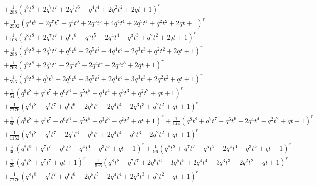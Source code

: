 \documentclass[11pt,english]{amsart}
\numberwithin{equation}{section}
\numberwithin{figure}{section}
\theoremstyle{plain}
\theoremstyle{plain}
\theoremstyle{definition}
\theoremstyle{remark}
\begin{document}
{\begin{align*}
& + \frac{1}{288}  {\left(q^{8} t^{8} + 2  q^{7} t^{7} + 2  q^{6} t^{6} - q^{4} t^{4} + 2  q^{2} t^{2} + 2  q t + 1\right)}^{r} \\
& + \frac{1}{2592}  {\left(q^{8} t^{8} + 2  q^{7} t^{7} + q^{6} t^{6} + 2  q^{5} t^{5} + 4  q^{4} t^{4} + 2  q^{3} t^{3} + q^{2} t^{2} + 2  q t + 1\right)}^{r} \\
& + \frac{1}{108}  {\left(q^{8} t^{8} + 2  q^{7} t^{7} + q^{6} t^{6} - q^{5} t^{5} - 2  q^{4} t^{4} - q^{3} t^{3} + q^{2} t^{2} + 2  q t + 1\right)}^{r} \\
& + \frac{1}{288}  {\left(q^{8} t^{8} + 2  q^{7} t^{7} + q^{6} t^{6} - 2  q^{5} t^{5} - 4  q^{4} t^{4} - 2  q^{3} t^{3} + q^{2} t^{2} + 2  q t + 1\right)}^{r} \\
& + \frac{1}{768}  {\left(q^{8} t^{8} + 2  q^{7} t^{7} - 2  q^{5} t^{5} - 2  q^{4} t^{4} - 2  q^{3} t^{3} + 2  q t + 1\right)}^{r} \\
& + \frac{1}{576}  {\left(q^{8} t^{8} + q^{7} t^{7} + 2  q^{6} t^{6} + 3  q^{5} t^{5} + 2  q^{4} t^{4} + 3  q^{3} t^{3} + 2  q^{2} t^{2} + q t + 1\right)}^{r} \\
& + \frac{1}{54}  {\left(q^{8} t^{8} + q^{7} t^{7} + q^{6} t^{6} + q^{5} t^{5} + q^{4} t^{4} + q^{3} t^{3} + q^{2} t^{2} + q t + 1\right)}^{r} \\
& + \frac{1}{7776}  {\left(q^{8} t^{8} + q^{7} t^{7} + q^{6} t^{6} - 2  q^{5} t^{5} - 2  q^{4} t^{4} - 2  q^{3} t^{3} + q^{2} t^{2} + q t + 1\right)}^{r} \\
& + \frac{1}{80}  {\left(q^{8} t^{8} + q^{7} t^{7} - q^{6} t^{6} - q^{5} t^{5} - q^{3} t^{3} - q^{2} t^{2} + q t + 1\right)}^{r} + \frac{1}{144}  {\left(q^{8} t^{8} + q^{7} t^{7} - q^{6} t^{6} + 2  q^{4} t^{4} - q^{2} t^{2} + q t + 1\right)}^{r} \\
& + \frac{1}{1152}  {\left(q^{8} t^{8} + q^{7} t^{7} - 2  q^{6} t^{6} - q^{5} t^{5} + 2  q^{4} t^{4} - q^{3} t^{3} - 2  q^{2} t^{2} + q t + 1\right)}^{r} \\
& + \frac{1}{30}  {\left(q^{8} t^{8} + q^{7} t^{7} - q^{5} t^{5} - q^{4} t^{4} - q^{3} t^{3} + q t + 1\right)}^{r} + \frac{1}{96}  {\left(q^{8} t^{8} + q^{7} t^{7} - q^{5} t^{5} - 2  q^{4} t^{4} - q^{3} t^{3} + q t + 1\right)}^{r} \\
& + \frac{1}{28}  {\left(q^{8} t^{8} + q^{7} t^{7} + q t + 1\right)}^{r} + \frac{1}{576}  {\left(q^{8} t^{8} - q^{7} t^{7} + 2  q^{6} t^{6} - 3  q^{5} t^{5} + 2  q^{4} t^{4} - 3  q^{3} t^{3} + 2  q^{2} t^{2} - q t + 1\right)}^{r} \\
& + \frac{1}{7776}  {\left(q^{8} t^{8} - q^{7} t^{7} + q^{6} t^{6} + 2  q^{5} t^{5} - 2  q^{4} t^{4} + 2  q^{3} t^{3} + q^{2} t^{2} - q t + 1\right)}^{r} \\

\end{align*}}
\end{document}
